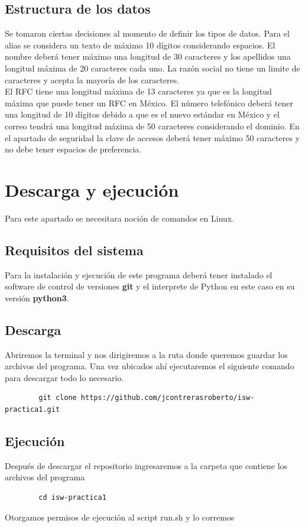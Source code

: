 \documentclass[12pt]{article}
\begin{document}
		\subsection{Estructura de los datos}
			Se tomaron ciertas decisiones al momento de definir los tipos de datos. Para el alias se considera un texto de máximo 10 dígitos considerando espacios. El nombre deberá tener máximo una longitud de 30 caracteres y los apellidos una longitud máxima de 20 caracteres cada uno. La razón social no tiene un limite de caracteres y acepta la mayoría de los caracteres.
			\\
			El RFC tiene una longitud máxima de 13 caracteres ya que es la longitud máxima que puede tener un RFC en México. El número telefónico deberá tener una longitud de 10 dígitos debido a que es el nuevo estándar en México y el correo tendrá una longitud máxima de 50 caracteres considerando el dominio.
			En el apartado de seguridad la clave de accesos deberá tener máximo 50 caracteres y no debe tener espacios de preferencia.
					
			
	\newpage	
	\section{Descarga y ejecución}
		Para este apartado se necesitara noción de comandos en Linux.
		\subsection{Requisitos del sistema}		
		Para la instalación y ejecución de este programa deberá tener instalado el software de control de versiones \textbf{git} y el interprete de Python en este caso en su versión \textbf{python3}. 
		
		\subsection{Descarga}		
		Abriremos la terminal y nos dirigiremos a la ruta donde queremos guardar los archivos del programa. Una vez ubicados ahí ejecutaremos el siguiente comando para descargar todo lo necesario.
		
		\begin{lstlisting}
		git clone https://github.com/jcontrerasroberto/isw-practica1.git
		\end{lstlisting}
		
		\subsection{Ejecución}	
		Después de descargar el repositorio ingresaremos a la carpeta que contiene los archivos del programa
		\begin{lstlisting}
		cd isw-practica1 
		\end{lstlisting}
		\newpage
		 Otorgamos permisos de ejecución al script run.sh y lo corremos
		
\end{document}

